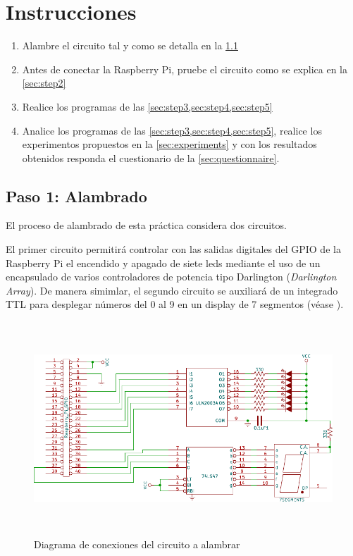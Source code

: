 \documentclass[letterpaper,10.5pt]{article}
\begin{document}

\section{Instrucciones}%
\label{sec:instructions}
\begin{enumerate}[noitemsep]
	\item Alambre el circuito tal y como se detalla en la \cref{sec:step1}
	\item Antes de conectar la Raspberry Pi, pruebe el circuito como se explica en la \cref{sec:step2}
	\item Realice los programas de las \cref{sec:step3,sec:step4,sec:step5}
	\item Analice los programas de las \cref{sec:step3,sec:step4,sec:step5}, realice los experimentos propuestos en la \cref{sec:experiments} y con los resultados obtenidos responda el cuestionario de la \cref{sec:questionnaire}.
\end{enumerate}

%
%
\subsection{Paso 1: Alambrado}%
\label{sec:step1}

El proceso de alambrado de esta práctica considera dos circuitos.

El primer circuito permitirá controlar con las salidas digitales del GPIO de la Raspberry Pi el encendido y apagado de siete leds mediante el uso de un encapsulado de varios controladores de potencia tipo Darlington (\textit{Darlington Array}).
De manera simimlar, el segundo circuito se auxiliará de un integrado TTL para desplegar números del 0 al 9 en un display de 7 segmentos (véase ).

\begin{figure}[H]
	\centering%
	\includegraphics[width=0.9\columnwidth,height=8cm,keepaspectratio]{img/p03-diagram.pdf} %
	\caption{Diagrama de conexiones del circuito a alambrar}
	\label{fig:wiring-diagram} %
\end{figure}
\end{document}
